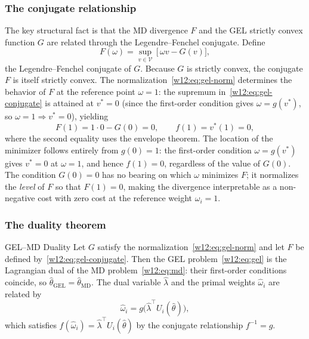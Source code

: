 \documentclass[master.tex]{subfiles}
\begin{document}
\subsubsection*{The conjugate relationship}

The key structural fact is that the MD divergence $F$ and the
GEL strictly convex function $G$ are related through the Legendre--Fenchel
conjugate.  Define
\begin{equation}
  F(\omega)
  = \sup_{v \in \mathcal{V}}\,\bigl[\,\omega v - G(v)\bigr],
  \label{w12:eq:gel-conjugate}
\end{equation}
the Legendre--Fenchel conjugate of $G$.  Because $G$ is strictly
convex, the conjugate $F$ is itself strictly convex.  The normalization~\eqref{w12:eq:gel-norm} determines the
behavior of $F$ at the reference point $\omega = 1$: the supremum
in~\eqref{w12:eq:gel-conjugate} is attained at $v^* = 0$
(since the first-order condition gives $\omega = g(v^*)$, so
$\omega = 1 \Rightarrow v^* = 0$), yielding
\begin{equation}
  F(1) = 1 \cdot 0 - G(0) = 0,
  \qquad
  f(1) = v^*(1) = 0,
  \label{w12:eq:gel-F-norm}
\end{equation}
where the second equality uses the envelope theorem.  The location of
the minimizer follows entirely from $g(0) = 1$: the first-order
condition $\omega = g(v^*)$ gives $v^* = 0$ at $\omega = 1$,
and hence $f(1) = 0$, regardless of the value of $G(0)$.  The
condition $G(0) = 0$ has no bearing on which $\omega$ minimizes
$F$; it normalizes the \emph{level} of $F$ so that $F(1) = 0$,
making the divergence interpretable as a non-negative cost with zero
cost at the reference weight $\omega_i = 1$.

\subsubsection*{The duality theorem}

\begin{thm}{GEL--MD Duality \citep{neweysmith2004,ragusa2011}}
\label{w12:thm:gel-md}
Let $G$ satisfy the normalization~\eqref{w12:eq:gel-norm} and
let $F$ be defined by~\eqref{w12:eq:gel-conjugate}.  Then the GEL
problem~\eqref{w12:eq:gel} is the Lagrangian dual of the MD
problem~\eqref{w12:eq:md}: their first-order conditions coincide, so
$\hat\theta_{\mathrm{GEL}} = \hat\theta_{\mathrm{MD}}$.  The dual
variable $\hat\lambda$ and the primal weights $\hat\omega_i$ are
related by
\[
  \hat\omega_i = g\!\bigl(\hat\lambda^\top U_i(\hat\theta)\bigr),
\]
which satisfies $f(\hat\omega_i) = \hat\lambda^\top U_i(\hat\theta)$
by the conjugate relationship $f^{-1} = g$.
\end{thm}
\end{document}

